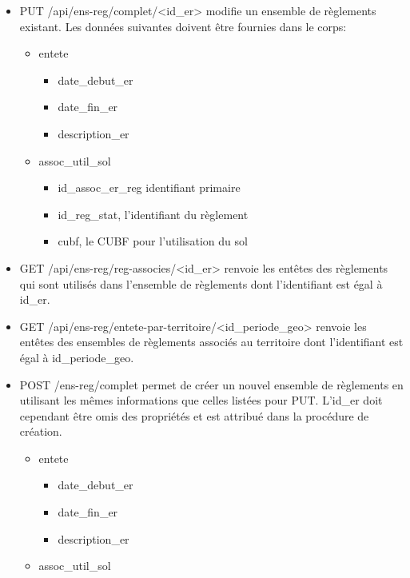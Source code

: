 \begin{itemize}
    \item PUT /api/ens-reg/complet/<id\_er> modifie un ensemble de règlements existant. Les données suivantes doivent être fournies dans le corps:
        \begin{itemize}
            \item entete
                \begin{itemize}
                    \item date\_debut\_er
                    \item date\_fin\_er
                    \item description\_er
                \end{itemize}
            \item assoc\_util\_sol
                \begin{itemize}
                    \item id\_assoc\_er\_reg identifiant primaire
                    \item id\_reg\_stat, l'identifiant du règlement
                    \item cubf, le \ac{CUBF} pour l'utilisation du sol
                \end{itemize}
        \end{itemize}
    \item GET /api/ens-reg/reg-associes/<id\_er> renvoie les entêtes des règlements qui sont utilisés dans l'ensemble de règlements dont l'identifiant est égal à id\_er.
    \item GET /api/ens-reg/entete-par-territoire/<id\_periode\_geo> renvoie les entêtes des ensembles de règlements associés au territoire dont l'identifiant est égal à id\_periode\_geo.
    \item POST /ens-reg/complet permet de créer un nouvel ensemble de règlements en utilisant les mêmes informations que celles listées pour PUT. L'id\_er doit cependant être omis des propriétés et est attribué dans la procédure de création.
        \begin{itemize}
            \item entete
                \begin{itemize}
                    \item date\_debut\_er
                    \item date\_fin\_er
                    \item description\_er
                \end{itemize}
            \item assoc\_util\_sol

\end{itemize}
\end{itemize}
